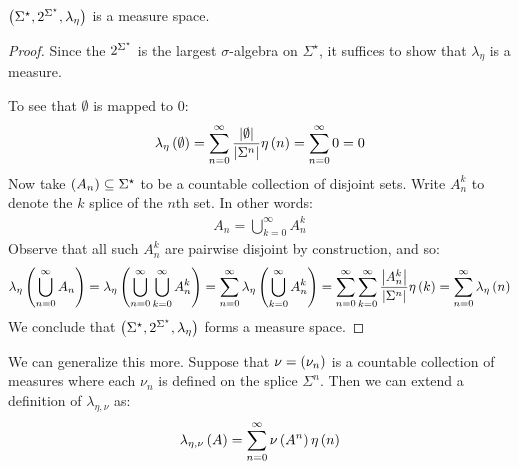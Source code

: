 \documentclass[12pt]{article}
\begin{document}
\begin{theorem}
  \(\left(\Sigma^\star, 2^{\Sigma^\star}, \lambda_{\eta}\right)\)
  is a measure space.
\end{theorem}
\begin{proof}
  Since the \(2^{\Sigma^\star}\) is the largest \(\sigma\)-algebra
  on \(\Sigma^\star\), it suffices to show that \(\lambda_{\eta}\) is
  a measure.

  To see that \(\emptyset\) is mapped to \(0\):
  \begin{align*}
    \lambda_{\eta}\left(\emptyset\right)
      = \sum_{n = 0}^{\infty} \frac{\left\lvert\emptyset\right\rvert}{\left\lvert\Sigma^n\right\rvert} \eta\left(n\right)
      = \sum_{n = 0}^{\infty} 0
      = 0
  \end{align*}
  Now take \(\left(A_n\right) \subseteq \Sigma^\star\) to be a countable
  collection of disjoint sets.
  Write \(A_n ^k\) to denote the \(k\) splice of the \(n\)th set.
  In other words: \begin{align*}
    A_n = \bigcup_{k = 0}^{\infty} A_{n} ^k
  \end{align*}
  Observe that all such \(A_{n}^k\) are pairwise disjoint by construction,
  and so:
  \begin{align*}
    \lambda_{\eta} \left(\bigcup_{n = 0}^{\infty} A_n\right)
      = \lambda_{\eta} \left(\bigcup_{n = 0}^{\infty} \bigcup_{k = 0}^{\infty} A_n ^k\right)
      = \sum_{n = 0}^{\infty} \lambda_{\eta} \left(\bigcup_{k = 0}^{\infty} A_n ^k\right)
      = \sum_{n = 0}^{\infty} \sum_{k = 0}^{\infty} \frac{\left\lvert A_n ^k\right\rvert}{\left\lvert\Sigma^n\right\rvert} \eta\left(k\right)
      = \sum_{n = 0}^{\infty} \lambda_{\eta} \left(n\right)
  \end{align*}
  We conclude that \(\left(\Sigma^\star, 2^{\Sigma^\star}, \lambda_{\eta}\right)\)
  forms a measure space.

\end{proof}
We can generalize this more.
Suppose that \(\nu = \left(\nu_n\right)\)
is a countable collection of measures where
each \(\nu_n\) is defined on the splice \(\Sigma^n\).
Then we can extend a definition of \(\lambda_{\eta, \nu}\) as:
\begin{align*}
  \lambda_{\eta, \nu} \left(A\right)
    = \sum_{n = 0}^{\infty} \nu\left(A^n\right) \eta\left(n\right)
\end{align*}
\end{document}
